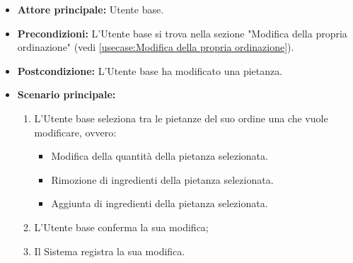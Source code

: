 \label{usecase:Modifica pietanza}
\begin{itemize}
	\item \textbf{Attore principale:} Utente base.

	\item \textbf{Precondizioni:}  L'Utente base si trova nella sezione "Modifica della propria ordinazione" (vedi \autoref{usecase:Modifica della propria ordinazione}).


	\item \textbf{Postcondizione:} L'Utente base ha modificato una pietanza.

	\item \textbf{Scenario principale:}
	      \begin{enumerate}
		      \item L'Utente base seleziona tra le pietanze del suo ordine una che vuole modificare, ovvero:
		            \begin{itemize}
			            \item Modifica della quantità della pietanza selezionata.
			            \item Rimozione di ingredienti della pietanza selezionata.
			            \item Aggiunta di ingredienti della pietanza selezionata.
		            \end{itemize}
		      \item L'Utente base conferma la sua modifica;
		      \item Il Sistema registra la sua modifica.
	      \end{enumerate}
\end{itemize}
